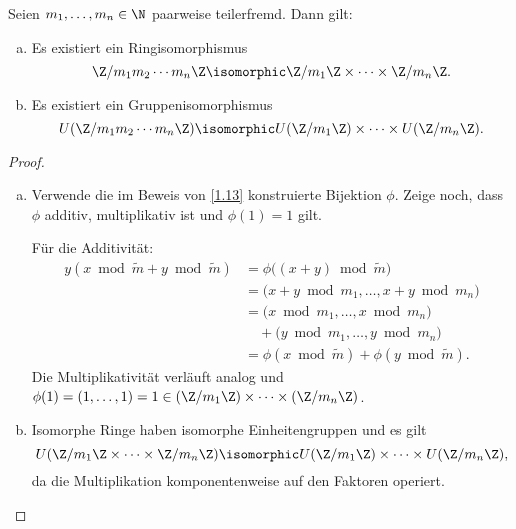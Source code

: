 \begin{st} \label{1.14}
	Seien $m_1, \dotsc, m_n \in \N$ paarweise teilerfremd.
	Dann gilt:
	\begin{enumerate}[a)]
		\item
			Es existiert ein Ringisomorphismus
			\[
				\Z / m_1m_2 \dotsb m_n \Z
				\isomorphic
				\Z /m_1 \Z \times \dotsb \times \Z / m_n \Z.
			\]
		\item
			Es existiert ein Gruppenisomorphismus
			\[
				U(\Z / m_1 m_2 \dotsb m_n \Z)
				\isomorphic
				U(\Z / m_1 \Z) \times \dotsb \times U(\Z / m_n \Z).
			\]
	\end{enumerate}
	\begin{proof}
		\begin{enumerate}[a)]
			\item
				Verwende die im Beweis von \ref{1.13} konstruierte Bijektion $\phi$.
				Zeige noch, dass $\phi$ additiv, multiplikativ ist und $\phi(1) = 1$ gilt.

				Für die Additivität:
				\begin{align*}
					y(x \bmod \tilde m + y \bmod \tilde m)
					&= \phi\big( (x+y) \bmod \tilde m \big) \\
					&= \big(x + y \bmod m_1, \dotsc, x + y \bmod m_n \big) \\
					&= \big( x \bmod m_1, \dotsc, x \bmod m_n\big) \\
					&\quad + \big(y \bmod m_1, \dotsc, y \bmod m_n \big) \\
					&= \phi(x \bmod \tilde m) + \phi(y \bmod \tilde m).
				\end{align*}
				Die Multiplikativität verläuft analog und $\phi(1) = (1, \dotsc, 1) = 1 \in (\Z / m_1 \Z) \times \dotsb \times (\Z / m_n \Z)$.
			\item
				Isomorphe Ringe haben isomorphe Einheitengruppen und es gilt
				\[
					U(\Z / m_1 \Z \times \dotsb \times \Z / m_n \Z)
					\isomorphic U(\Z / m_1 \Z) \times \dotsb \times U(\Z / m_n \Z),
				\]
				da die Multiplikation komponentenweise auf den Faktoren operiert.
		\end{enumerate}
	\end{proof}
\end{st}

